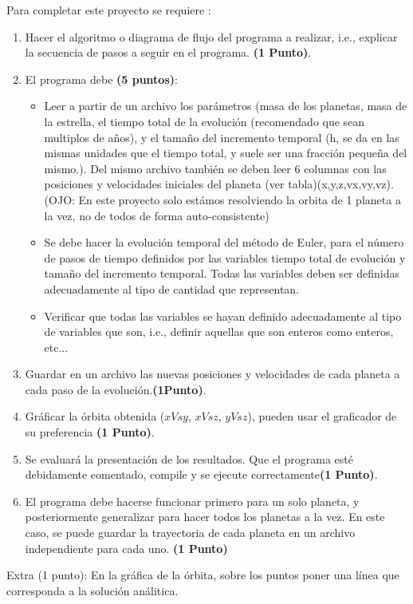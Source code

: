 \documentclass[a4paper,10pt]{article}
\begin{document}
\begin{enumerate}
Para completar este proyecto se requiere :

\begin{enumerate}
 \item Hacer el algoritmo o diagrama de flujo del  programa a realizar, i.e., explicar la secuencia de pasos a seguir en el programa. {\bf (1 Punto)}.
 
 \item El programa debe {\bf(5 puntos)}:
 \begin{itemize}
	\item Leer a partir de un archivo los parámetros (masa de los planetas, masa de la estrella, el tiempo total de la evolución (recomendado que sean multiplos de años), y el tama\~no del incremento temporal (h, se da en las mismas unidades que el tiempo total, y suele ser una fracción pequeña del mismo.). Del mismo archivo tambi\'en se deben leer  6 columnas con las posiciones y velocidades iniciales del planeta (ver tabla)(x,y,z,vx,vy,vz). (OJO: En este proyecto solo est\'amos resolviendo la orbita de 1 planeta a la vez, no de todos de forma auto-consistente) 
	
\item Se debe hacer la evolución temporal del método de Euler, para el n\'umero de pasos de tiempo definidos por las variables tiempo total de evolución y tamaño del incremento temporal. Todas las variables deben ser definidas adecuadamente al tipo de cantidad que representan.   

\item Verificar que todas las variables se hayan definido adecuadamente al tipo de variables que son, i.e., definir aquellas que son enteros como enteros, etc...   
 \end{itemize}

\item Guardar en un archivo las nuevas posiciones y velocidades de cada planeta a cada paso de la  evolución.{\bf(1Punto)}. 

\item Gráficar la órbita obtenida ($x Vs y$, $x Vs z$, $y Vs z$), pueden usar el graficador de su preferencia  {\bf(1 Punto)}.
\item Se evaluar\'a la presentaci\'on de los resultados. Que el programa est\'e debidamente comentado, compile y se ejecute correctamente{\bf(1 Punto)}. 

\item El programa debe hacerse funcionar primero para un solo planeta, y posteriormente generalizar para hacer todos los planetas a la vez. En este caso, se puede guardar la trayectoria de cada planeta en un archivo independiente para cada uno. {\bf(1 Punto)}

\end{enumerate}

 Extra (1 punto): En la gráfica de la \'orbita, sobre los puntos poner una línea que corresponda a la solución an\'alitica. 






\end{enumerate}
\end{document}
